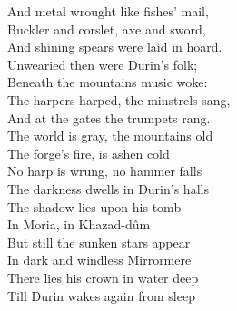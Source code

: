 And metal wrought like fishes' mail, \\
Buckler and corslet, axe and sword, \\
And shining spears were laid in hoard. \\
\hops
\tab{}\tab{}
\hops
{}
Unwearied then were Durin's folk; \\
Beneath the mountains music woke: \\
The harpers harped, the minstrels sang, \\
And at the gates the trumpets rang. \\
\hop
The world is gray, the mountains old \\
The forge's fire, is ashen cold  \tab{}\\
No harp is wrung, no hammer falls \\
The darkness dwells in Durin's halls \\
The shadow lies upon his tomb \\
In Moria, in Khazad-dûm \tab{}\\
But still the sunken stars appear  \\
In dark and windless Mirrormere  \\
There lies his crown in water deep  \\
Till Durin wakes again from sleep 